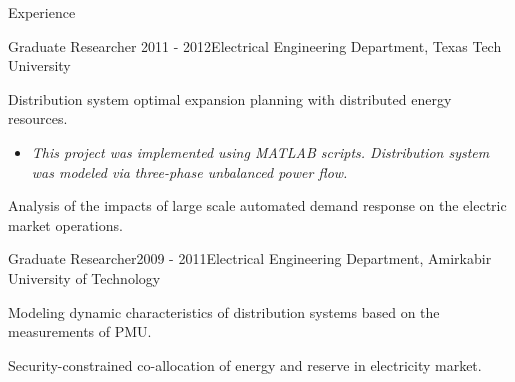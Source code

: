 \documentclass{resume} %
\begin{document}
\begin{rSection}{ Experience}
\begin{rSubsection}{Graduate Researcher }{2011 - 2012}{Electrical Engineering Department, Texas Tech University}{}
\item	[] Distribution system optimal expansion planning with distributed energy resources. 
\begin{itemize}

\item [] \emph{This project was implemented using MATLAB scripts. Distribution system was modeled via three-phase unbalanced power flow.}
\end{itemize}


\item []	Analysis of the impacts of large scale automated demand response on the electric market operations.

\end{rSubsection}



\begin{rSubsection}{Graduate Researcher}{2009 - 2011}{Electrical Engineering Department, Amirkabir University of Technology}{}

\item []	Modeling dynamic characteristics of distribution systems based on the measurements of PMU.
\item []	Security-constrained co-allocation of energy and reserve in electricity market.



\end{rSubsection}
\end{rSection}


\end{document}
